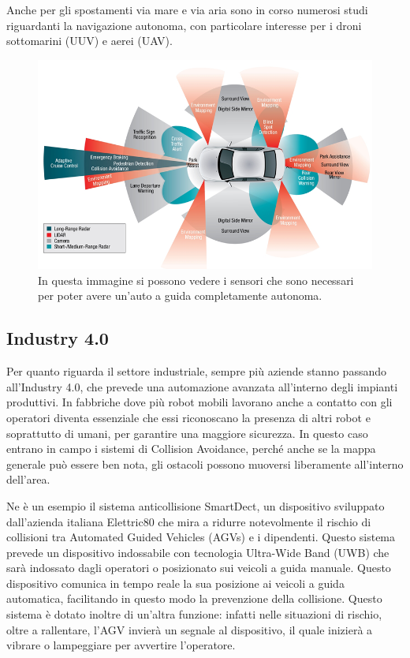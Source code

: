 \documentclass[Lau, binding=0.6cm, oneside]{sapthesis}
\begin{document}
Anche per gli spostamenti via mare e via aria sono in corso numerosi studi riguardanti la navigazione autonoma, con particolare interesse per i droni sottomarini (UUV) e aerei (UAV).

\begin{figure}[H]
    \centering
    \includegraphics[width=12.5cm]{driverless_car.png}
    \caption{In questa immagine si possono vedere i sensori che sono necessari per poter avere un'auto a guida completamente autonoma.}
    \label{fig:driverless_car}
\end{figure}

\subsection{Industry 4.0}
Per quanto riguarda il settore industriale, sempre più aziende stanno passando all'Industry 4.0, che prevede una automazione avanzata all'interno degli impianti produttivi.
In fabbriche dove più robot mobili lavorano anche a contatto con gli operatori diventa essenziale che essi riconoscano la presenza di altri robot e soprattutto di umani, per garantire una maggiore sicurezza.
In questo caso entrano in campo i sistemi di Collision Avoidance, perché anche se la mappa generale può essere ben nota, gli ostacoli possono muoversi liberamente all'interno dell'area.

Ne è un esempio il sistema anticollisione SmartDect, un dispositivo sviluppato dall'azienda italiana Elettric80 che mira a ridurre notevolmente il rischio di collisioni tra Automated Guided Vehicles (AGVs) e i dipendenti\cite{fonte9}.
Questo sistema prevede un dispositivo indossabile con tecnologia Ultra-Wide Band (UWB) che sarà indossato dagli operatori o posizionato sui veicoli a guida manuale.
Questo dispositivo comunica in tempo reale la sua posizione ai veicoli a guida automatica, facilitando in questo modo la prevenzione della collisione.
Questo sistema è dotato inoltre di un'altra funzione: infatti nelle situazioni di rischio, oltre a rallentare, l'AGV invierà un segnale al dispositivo, il quale inizierà a vibrare o lampeggiare per avvertire l'operatore\cite{fonte10}.
\end{document}
